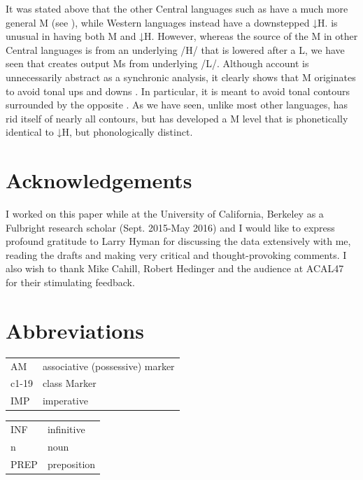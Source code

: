 \documentclass[output=paper,modfonts,nonflat,
colorlinks, citecolor=brown,
draftmode
]{langsci/langscibook}
\begin{document}
It was stated above that the other Central  languages such as  have a much more general M  (see \citealt{hyman2005}), while Western   languages instead have a downstepped ↓H.  is unusual in having both M and ↓H. However, whereas the source of the M in other Central  languages is from an underlying /H/ that is lowered after a L, we have seen that  creates output Ms from underlying /L/. Although  account is unnecessarily abstract as a synchronic analysis, it clearly shows that M  originates to avoid tonal ups and downs \citep[15]{hyman2010}. In particular, it is meant to avoid tonal contours surrounded by the opposite . As we have seen, unlike most other  languages,  has rid itself of nearly all contours, but has developed a M  level that is phonetically identical to ↓H, but phonologically distinct. 

\section*{Acknowledgements}

I worked on this paper while at the University of California, Berkeley as a Fulbright research scholar (Sept. 2015-May 2016) and I would like to express profound gratitude to Larry Hyman for discussing the data extensively with me, reading the drafts and making very critical and thought-provoking comments. I also wish to thank Mike Cahill, Robert Hedinger and the audience at ACAL47 for their stimulating feedback.

\section*{Abbreviations}
\begin{tabularx}{.55\textwidth}{ll}
AM & associative (possessive) marker \\
c1-19 & class Marker \\
IMP & imperative \\
\end{tabularx}
\begin{tabularx}{.45\textwidth}{ll}
INF & infinitive\\
n & noun\\
PREP & preposition\\
\end{tabularx}

\end{document}
